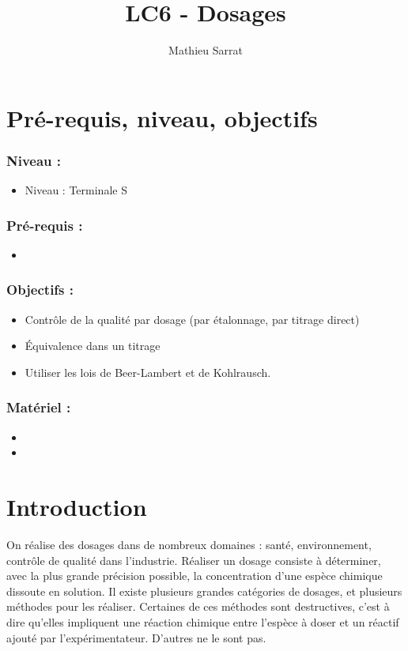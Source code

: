 \documentclass[11pt,a4paper]{report}
\author{Mathieu Sarrat}
\title{LC6 - Dosages}
\begin{document}
\maketitle

\section*{Pré-requis, niveau, objectifs}


\subsubsection*{Niveau :}
\begin{itemize}
	\item Niveau : Terminale S
\end{itemize}

\subsubsection*{Pré-requis :}
\begin{itemize}
	\item 
\end{itemize}

\subsubsection*{Objectifs :}
\begin{itemize}
	\item Contrôle de la qualité par dosage (par étalonnage, par titrage direct)
	\item Équivalence dans un titrage
	\item Utiliser les lois de Beer-Lambert et de Kohlrausch.
\end{itemize}

\subsubsection*{Matériel :}
\begin{itemize}
	\item
	\item 
\end{itemize}

\newpage
\section*{Introduction}

On réalise des dosages dans de nombreux domaines : santé, environnement, contrôle de qualité dans l'industrie. Réaliser un dosage consiste à déterminer, avec la plus grande précision possible, la concentration d'une espèce chimique dissoute en solution. Il existe plusieurs grandes catégories de dosages, et plusieurs méthodes pour les réaliser. Certaines de ces méthodes sont destructives, c'est à dire qu'elles impliquent une réaction chimique entre l'espèce à doser et un réactif ajouté par l'expérimentateur. D'autres ne le sont pas.\\
\end{document}

